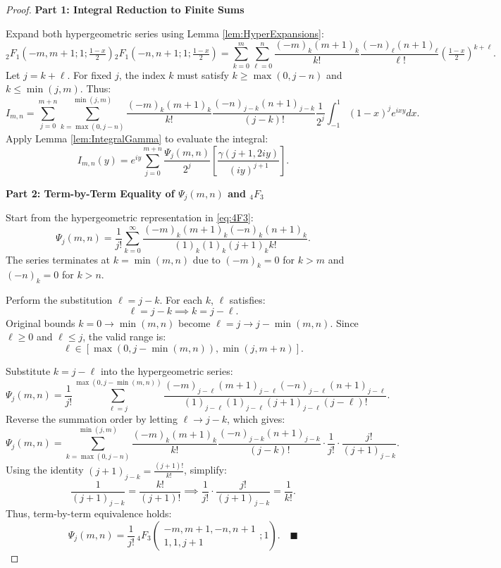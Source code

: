 \documentclass[12pt]{article}
\begin{document}
\begin{proof}
\textbf{Part 1: Integral Reduction to Finite Sums}

Expand both hypergeometric series using Lemma \ref{lem:HyperExpansions}:
\[
{}_2F_1\left(-m,m+1;1;\tfrac{1-x}{2}\right){}_2F_1\left(-n,n+1;1;\tfrac{1-x}{2}\right) = \sum_{k=0}^m \sum_{\ell=0}^n \frac{(-m)_k(m+1)_k}{k!} \frac{(-n)_\ell(n+1)_\ell}{\ell!} \left(\tfrac{1-x}{2}\right)^{k+\ell}.
\]
Let \( j = k + \ell \). For fixed \( j \), the index \( k \) must satisfy \( k \geq \max(0, j - n) \) and \( k \leq \min(j, m) \). Thus:
\[
I_{m,n} = \sum_{j=0}^{m+n} \sum_{k=\max(0,j-n)}^{\min(j,m)} \frac{(-m)_k(m+1)_k}{k!} \frac{(-n)_{j-k}(n+1)_{j-k}}{(j - k)!} \frac{1}{2^j} \int_{-1}^1 (1-x)^j e^{ixy}dx.
\]
Apply Lemma \ref{lem:IntegralGamma} to evaluate the integral:
\[
I_{m,n}(y) = e^{iy}\sum_{j=0}^{m+n}\frac{\Psi_j(m,n)}{2^j}\left[\frac{\gamma(j+1,2iy)}{(iy)^{j+1}}\right].
\]

\textbf{Part 2: Term-by-Term Equality of \( \Psi_j(m,n) \) and \( {}_4F_3 \)}

Start from the hypergeometric representation in \eqref{eq:4F3}:
\[
\Psi_j(m,n) = \frac{1}{j!} \sum_{k=0}^\infty \frac{(-m)_k(m+1)_k(-n)_k(n+1)_k}{(1)_k(1)_k(j+1)_k k!}.
\]
The series terminates at \( k = \min(m, n) \) due to \((-m)_k = 0\) for \( k > m \) and \((-n)_k = 0\) for \( k > n \). 

Perform the substitution \( \ell = j - k \). For each \( k \), \(\ell\) satisfies:
\[
\ell = j - k \implies k = j - \ell.
\]
Original bounds \( k = 0 \to \min(m, n) \) become \( \ell = j \to j - \min(m, n) \). Since \( \ell \geq 0 \) and \( \ell \leq j \), the valid range is:
\[
\ell \in \left[\max(0, j - \min(m, n)), \min(j, m + n)\right].
\]

Substitute \( k = j - \ell \) into the hypergeometric series:
\[
\Psi_j(m,n) = \frac{1}{j!} \sum_{\ell=j}^{\max(0, j - \min(m, n))} \frac{(-m)_{j-\ell}(m+1)_{j-\ell}(-n)_{j-\ell}(n+1)_{j-\ell}}{(1)_{j-\ell}(1)_{j-\ell}(j+1)_{j-\ell} (j - \ell)!}.
\]
Reverse the summation order by letting \( \ell \to j - k \), which gives:
\[
\Psi_j(m,n) = \sum_{k=\max(0,j-n)}^{\min(j,m)} \frac{(-m)_k(m+1)_k}{k!} \frac{(-n)_{j-k}(n+1)_{j-k}}{(j - k)!} \cdot \frac{1}{j!} \cdot \frac{j!}{(j+1)_{j-k}}.
\]
Using the identity \( (j+1)_{j-k} = \frac{(j+1)!}{k!} \), simplify:
\[
\frac{1}{(j+1)_{j-k}} = \frac{k!}{(j+1)!} \implies \frac{1}{j!} \cdot \frac{j!}{(j+1)_{j-k}} = \frac{1}{k!}.
\]
Thus, term-by-term equivalence holds:  
\[
\Psi_j(m,n) = \frac{1}{j!}\,{}_4F_3\left(\begin{array}{c} -m, m+1, -n, n+1 \\ 1, 1, j+1 \end{array};1\right). \quad \blacksquare
\]
\end{proof}
\end{document}
